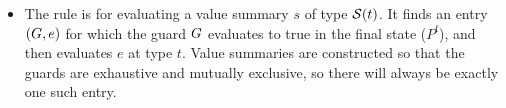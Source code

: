 {\begin{itemize}
\item The  rule is for evaluating a value summary $s$ of type $\mathcal{S}(t)$. It finds an entry $(G,e)$ for which the guard $G$ evaluates to true in the final state ($P^{\mathrm{f}}$), and then evaluates $e$ at type $t$. Value summaries are constructed so that the guards are exhaustive and mutually exclusive, so there will always be exactly one such entry.

\end{itemize}











}
